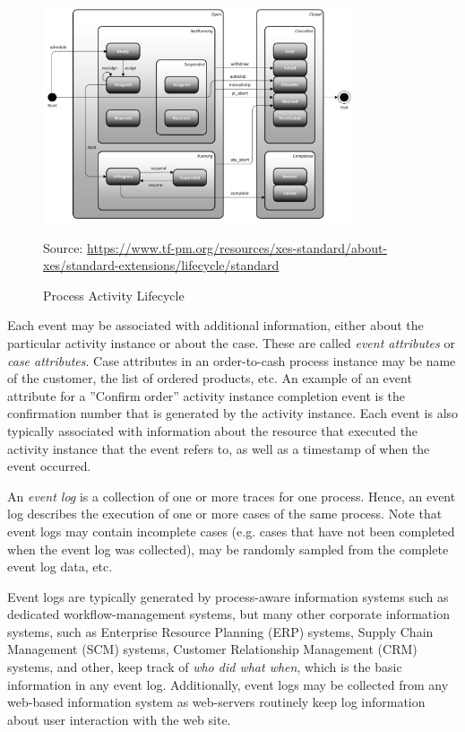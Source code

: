 \begin{figure}
\centering
\includegraphics[height=2.5in]{screen1.png}

\scriptsize Source: \url{https://www.tf-pm.org/resources/xes-standard/about-xes/standard-extensions/lifecycle/standard}
\normalsize
\caption{Process Activity Lifecycle}
\label{fig:activitylifecycle}
\end{figure}

Each event may be associated with additional information, either about the particular activity instance or about the case. These are called \emph{event attributes} or \emph{case attributes}. Case attributes in an order-to-cash process instance may be name of the customer, the list of ordered products, etc. An example of an event attribute for a ''Confirm order'' activity instance completion event is the confirmation number that is generated by the activity instance. Each event is also typically associated with information about the resource that executed the activity instance that the event refers to, as well as a timestamp of when the event occurred.

An \emph{event log} is a collection of one or more traces for one process. Hence, an event log describes the execution of one or more cases of the same process. Note that event logs may contain incomplete cases (e.g. cases that have not been completed when the event log was collected), may be randomly sampled from the complete event log data, etc.

Event logs are typically generated by process-aware information systems such as dedicated workflow-management systems, but many other corporate information systems, such as Enterprise Resource Planning (ERP) systems, Supply Chain Management (SCM) systems, Customer Relationship Management (CRM) systems, and other, keep track of \emph{who did what when}, which is the basic information in any event log. Additionally, event logs may be collected from any web-based information system as web-servers routinely keep log information about user interaction with the web site. 

